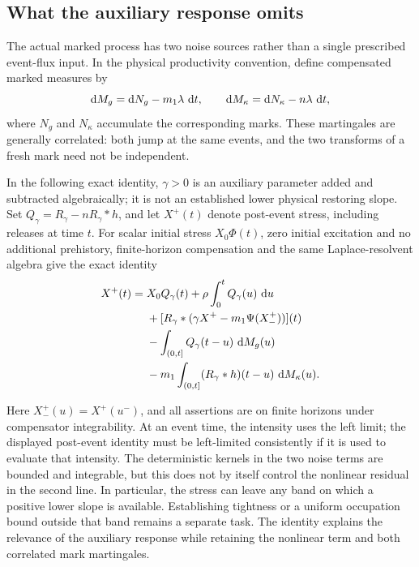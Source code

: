 \subsection{What the auxiliary response omits}

The actual marked process has two noise sources rather than a single prescribed event-flux input. In the physical productivity convention, define compensated marked measures by
\[
\mathop{}\!\mathrm{d} M_g=\mathop{}\!\mathrm{d} N_g-m_1\lambda\,\mathop{}\!\mathrm{d} t,\qquad
\mathop{}\!\mathrm{d} M_\kappa=\mathop{}\!\mathrm{d} N_\kappa-n\lambda\,\mathop{}\!\mathrm{d} t,
\]
where $N_g$ and $N_\kappa$ accumulate the corresponding marks. These martingales are generally correlated: both jump at the same events, and the two transforms of a fresh mark need not be independent. 

\begin{samepage}
In the following exact identity, \(\gamma>0\) is an auxiliary parameter added and subtracted algebraically; it is not an established lower physical restoring slope. Set $Q_\gamma=R_\gamma-nR_\gamma*h$, and let $X^+(t)$ denote post-event stress, including releases at time $t$. For scalar initial stress \(X_0\Phi(t)\), zero initial excitation and no additional prehistory, finite-horizon compensation and the same Laplace-resolvent algebra give the exact identity
\begin{align}
X^+(t)={}&X_0Q_\gamma(t)+\rho\int_0^tQ_\gamma(u)\,\mathop{}\!\mathrm{d} u \notag\\
&+[R_\gamma*(\gamma X^+-m_1\Psi(X^+_-))](t) \notag\\
&-\int_{(0,t]}Q_\gamma(t-u)\,\mathop{}\!\mathrm{d} M_g(u) \notag\\
&-m_1\int_{(0,t]}(R_\gamma*h)(t-u)\,\mathop{}\!\mathrm{d} M_\kappa(u).
\label{eq:marked-resolvent}
\end{align}
\end{samepage}
Here $X^+_-(u)=X^+(u^-)$, and all assertions are on finite horizons under compensator integrability. At an event time, the intensity uses the left limit; the displayed post-event identity must be left-limited consistently if it is used to evaluate that intensity. The deterministic kernels in the two noise terms are bounded and integrable, but this does not by itself control the nonlinear residual in the second line. In particular, the stress can leave any band on which a positive lower slope is available. Establishing tightness or a uniform occupation bound outside that band remains a separate task. The identity explains the relevance of the auxiliary response while retaining the nonlinear term and both correlated mark martingales.


